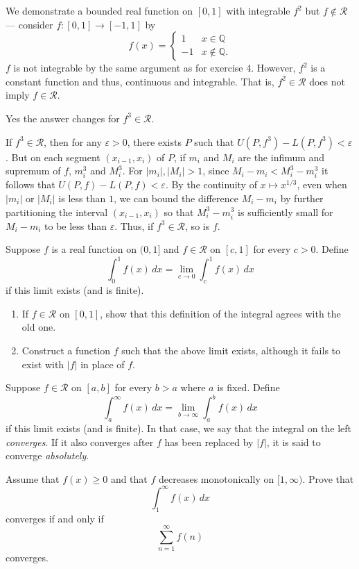 \documentclass[12 pt, letterpaper]{hmcpset}
\begin{document}
\begin{solution}
	We demonstrate a bounded real function on $[0, 1]$ with integrable $f^{2}$ but $f \notin \mathscr{R}$ --- consider $f : [0, 1] \to [-1, 1]$ by
	\[
		f(x) = \begin{cases}
			1 & x \in \mathbb{Q} \\
			-1 & x \notin \mathbb{Q}.
		\end{cases}
	\]
	$f$ is not integrable by the same argument as for exercise 4. However, $f^{2}$ is a constant function and thus, continuous and integrable. That is, $f^{2} \in \mathscr{R}$ does not imply $f \in \mathscr{R}$.

	Yes the answer changes for $f^{3} \in \mathscr{R}$.

	If $f^{3} \in \mathscr{R}$, then for any $\varepsilon > 0$, there exists $P$ such that $U(P, f^{3}) - L(P, f^{3}) < \varepsilon$. But on each segment $(x_{i - 1}, x_{i})$ of $P$, if $m_{i}$ and $M_{i}$ are the infimum and supremum of $f$, $m_{i}^{3}$ and $M_{i}^{3}$. For $\lvert m_{i} \rvert, \lvert M_{i} \rvert > 1$, since $M_{i} - m_{i} < M_{i}^{3} - m_{i}^{3}$ it follows that $U(P, f) - L(P, f) < \varepsilon$. By the continuity of $x \mapsto x^{1/3}$, even when $\lvert m_{i} \rvert$ or $\lvert M_{i} \rvert$ is less than $1$, we can bound the difference $M_{i} - m_{i}$ by further partitioning the interval $(x_{i - 1}, x_{i})$ so that $M_{i}^{3} - m_{i}^{3}$ is sufficiently small for $M_{i} - m_{i}$ to be less than $\varepsilon$. Thus, if $f^{3} \in \mathscr{R}$, so is $f$.
\end{solution}

\pagebreak

\begin{problem}[7.]
	Suppose $f$ is a real function on $(0, 1]$ and $f \in \mathscr{R}$ on $[c, 1]$ for every $c > 0$. Define
	\[
		\int_{0}^{1} f(x) \, dx = \lim_{c \to 0} \int_{c}^{1} f(x) \, dx
	\]
	if this limit exists (and is finite).
	\begin{enumerate}
		\item If $f \in \mathscr{R}$ on $[0, 1]$, show that this definition of the integral agrees with the old one.
		\item Construct a function $f$ such that the above limit exists, although it fails to exist with $\lvert f \rvert$ in place of $f$.
	\end{enumerate}
\end{problem}

\pagebreak

\begin{problem}[8.]
	Suppose $f \in \mathscr{R}$ on $[a, b]$ for every $b > a$ where $a$ is fixed. Define
	\[
		\int_{a}^{\infty} f(x) \, dx = \lim_{b \to \infty} \int_{a}^{b} f(x) \, dx
	\]
	if this limit exists (and is finite). In that case, we say that the integral on the left \emph{converges}. If it also converges after $f$ has been replaced by $\lvert f \rvert$, it is said to converge \emph{absolutely}.

	Assume that $f(x) \ge 0$ and that $f$ decreases monotonically on $[1, \infty)$. Prove that
	\[
		\int_{1}^{\infty} f(x) \, dx 
	\]
	converges if and only if
	\[
		\sum_{n = 1}^{\infty} f(n)
	\]
	converges.
\end{problem}
\end{document}
